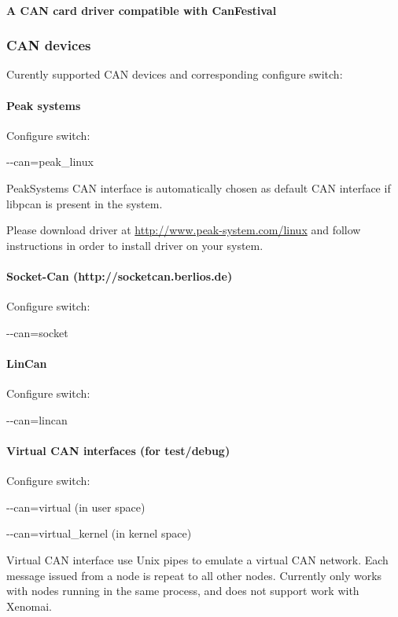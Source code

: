 \documentclass[a4paper,12pt]{book}
\begin{document}
\paragraph{A CAN card driver compatible with CanFestival}

\subsubsection{CAN devices}
Curently supported CAN devices and corresponding configure switch:

\paragraph{Peak systems}
Configure switch:

{\ttfamily
{}-{}-can=peak\_linux}

PeakSystems CAN interface is automatically chosen as default CAN
interface if libpcan is present in the system.

Please download driver at
\href{http://www.peak-system.com/linux}{http://www.peak{}-system.com/linux}
and follow instructions in order to install driver on your system.

\paragraph{Socket{}-Can (http://socketcan.berlios.de)}
Configure switch:

{\ttfamily
{}-{}-can=socket}

\paragraph{LinCan}
Configure switch:

{\ttfamily
{}-{}-can=lincan}

\paragraph{Virtual CAN interfaces (for test/debug)}
Configure switch:

{\ttfamily
{}-{}-can=virtual (in user space)}

{\ttfamily
{}-{}-can=virtual\_kernel (in kernel space)}


Virtual CAN interface use Unix pipes to emulate a virtual CAN network.
Each message issued from a node is repeat to all other nodes. Currently
only works with nodes running in the same process, and does not support
work with Xenomai.
\end{document}
